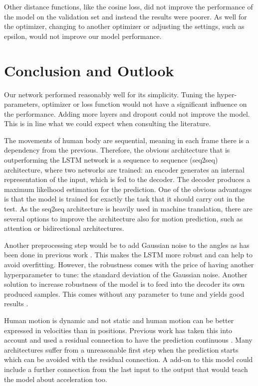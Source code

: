 Other distance functions, like the cosine loss, did not improve the performance of the model on the validation set and instead the results were poorer. As well for the optimizer, changing to another optimizer or adjusting the settings, such as epsilon, would not improve our model performance. 

\section{Conclusion and Outlook}
Our network performed reasonably well for its simplicity. Tuning the hyper-parameters, optimizer or loss function would not have a significant influence on the performance. Adding more layers and dropout could not improve the model. This is in line what we could expect when consulting the literature. 

The movements of human body are sequential, meaning in each frame there is a dependency from the previous. Therefore, the obvious architecture that is outperforming the LSTM network is a sequence to sequence (seq2seq) architecture, where two networks are trained: an encoder generates an internal representation of the input, which is fed to the decoder. The decoder produces a maximum likelhood estimation for the prediction. One of the obvious advantages is that  the model is trained for exactly the task that it should carry out in the test. As the seq2seq architecture is heavily used in machine translation, there are several options to improve the architecture also for motion prediction, such as attention or bidirectional architectures. 

Another preprocessing step would be to add Gaussian noise to the angles as has been done in previous work \cite{Fragkiadaki2014}. This makes the LSTM more robust and can help to avoid overfitting. However, the robustness comes with the price of having another hyperparameter to tune: the standard deviation of the Gaussian noise. Another solution to increase robustness of the model is to feed into the decoder its own produced samples. This comes without any parameter to tune and yields good results \cite{Martinez2017}.

Human motion is dynamic and not static and human motion can be better expressed in velocities than in positions. Previous work has taken this into account and used a residual connection to have the prediction continuous \cite{Martinez2017}. Many architectures suffer from a unreasonable first step when the prediction starts which can be avoided with the residual connection. A add-on to this model could include a further connection from the last input to the output that would teach the model about acceleration too. 


